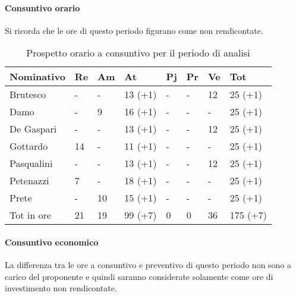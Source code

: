 			\paragraph{Consuntivo orario}
			Si ricorda che le ore di questo periodo figurano come non rendicontate.
								\begin{table}[H] \begin{center} \begin{tabular}{llllllll}
								\toprule
								\textbf{Nominativo}	&	\textbf{Re}		&	\textbf{Am}		&	\textbf{At}		&	\textbf{Pj}		&	\textbf{Pr}		&	\textbf{Ve}		&	\textbf{Tot}		 \\
								\midrule																						 
								Brutesco	&	-		&	-		&	13	(+1)	&	-		&	-		&	12		&	25	(+1)\\
								Damo		&	-		&	9		&	16	(+1)	&	-		&	-		&	-		&	25	(+1)\\
								De Gaspari	&	-		&	-		&	13	(+1)	&	-		&	-		&	12		&	25	(+1)\\
								Gottardo	&	14		&	-		&	11	(+1)	&	-		&	-		&	-		&	25	(+1)\\
								Pasqualini	&	-		&	-		&	13	(+1)	&	-		&	-		&	12		&	25	(+1)\\
								Petenazzi	&	7		&	-		&	18	(+1)	&	-		&	-		&	-		&	25	(+1)\\
								Prete		&	-		&	10		&	15	(+1)	&	-		&	-		&	-		&	25	(+1)\\
								\midrule																					
								Tot in ore	&	21		&	19		&	99	(+7)	&	0		&	0		&	36		&	175	(+7)\\
								\bottomrule
								\end{tabular} \end{center} \caption{Prospetto orario a consuntivo per il periodo di analisi}\label{tab:oreAnalisiCons}
									\end{table}
			\paragraph{Consuntivo economico}
			La differenza tra le ore a consuntivo e preventivo di questo periodo non sono a carico del proponente e quindi saranno considerate solamente come ore di investimento non rendicontate.


